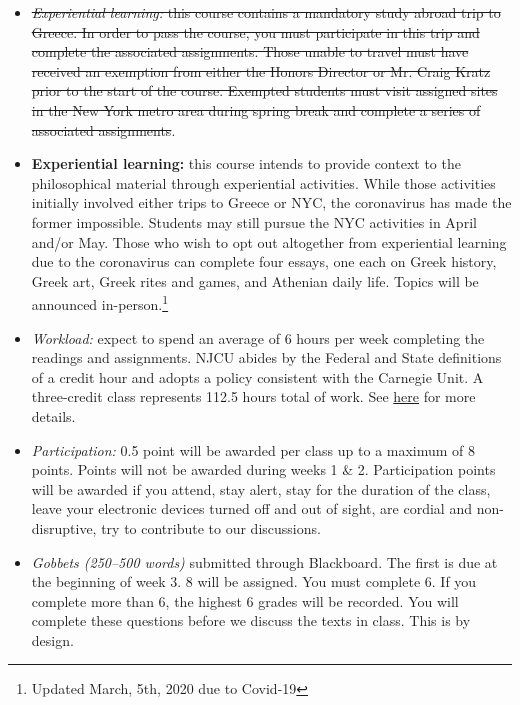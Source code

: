 \documentclass[article,oneside]{memoir}
\begin{document}
\begin{itemize}

\item \sout {\textit{Experiential learning:} this course contains a mandatory study abroad trip to Greece. In order to pass the course, you must participate in this trip and complete the associated assignments. Those unable to travel must have received an exemption from either the Honors Director or Mr. Craig Kratz prior to the start of the course. Exempted students must visit assigned sites in the New York metro area during spring break and complete a series of associated assignments}.

\item \textbf{Experiential learning:} this course intends to provide context to the philosophical material through experiential activities. While those activities initially involved either trips to Greece or NYC, the coronavirus has made the former impossible.  Students may still pursue the NYC activities in April and/or May. Those who wish to opt out altogether from experiential learning due to the coronavirus can complete four essays, one each on Greek history, Greek art, Greek rites and games, and Athenian daily life. Topics will be announced in-person.\footnote{Updated March, 5th, 2020 due to Covid-19}

\item \textit{Workload:} expect to spend an average of 6 hours per week completing the readings and assignments. NJCU abides by the Federal and State definitions of a credit hour and adopts a policy consistent with the Carnegie Unit. A three-credit class represents 112.5 hours total of work. See \href{http://scottoconnor.org/resources/Credit.pdf}{here} for more details.

\item \textit{Participation:} 0.5 point will be awarded per class up to a maximum of 8 points. Points will not be awarded during weeks 1 \& 2. Participation points will be awarded if you attend, stay alert, stay for the duration of the class, leave your electronic devices turned off and out of sight, are cordial and non-disruptive, try to contribute to our discussions. 


\item \textit{Gobbets (250--500 words)} submitted through Blackboard. The first is due at the beginning of week 3. 8 will be assigned. You must complete 6. If you complete more than 6, the highest 6 grades will be recorded. You will complete these questions before we discuss the texts in class. This is by design. 


\end{itemize}
\end{document}
